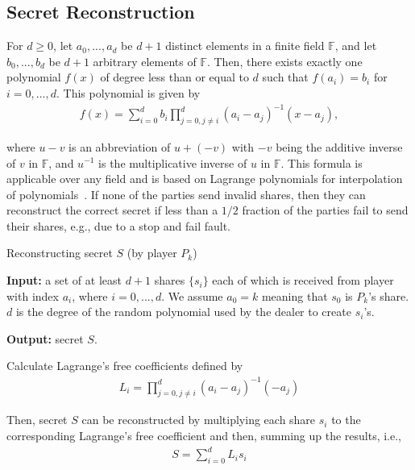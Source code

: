 \documentclass[10pt]{article}
\theoremstyle{plain}
\begin{document}
\subsection{Secret Reconstruction}

\label{sec:Shamir-Reconstruction} For $d\geq0$, let $a_{0},...,a_{d}$
be $d+1$ distinct elements in a finite field $\mathbb{F}$, and let
$b_{0},...,b_{d}$ be $d+1$ arbitrary elements of $\mathbb{F}$.
Then, there exists exactly one polynomial $f(x)$ of degree less than
or equal to $d$ such that $f(a_{i})=b_{i}$ for $i=0,...,d$. This
polynomial is given by 
\begin{align}
f(x)=\sum_{i=0}^{d}b_{i}\prod_{j=0,j\neq i}^{d}(a_{i}-a_{j})^{-1}(x-a_{j}),\label{eq:lagrange-polynomial}
\end{align}

where $u-v$ is an abbreviation of $u+(-v)$ with $-v$ being the
additive inverse of $v$ in $\mathbb{F}$, and $u^{-1}$ is the multiplicative
inverse of $u$ in $\mathbb{F}$. This formula is applicable over
any field and is based on Lagrange polynomials for interpolation of
polynomials~\cite{Huang:2010:URL}. If none of the parties send invalid
shares, then they can reconstruct the correct secret if less than
a $1/2$ fraction of the parties fail to send their shares, e.g.,
due to a stop and fail fault. 

\begin{algorithm}
	\caption{Reconstructing secret $S$ (by player $P_{k}$)}
	
	\label{pr:shamir-reconstruction} \textbf{Input:} a set of at least
	$d+1$ shares $\{s_{i}\}$ each of which is received from player with
	index $a_{i}$, where $i=0,...,d$. We assume $a_{0}=k$ meaning that
	$s_{0}$ is $P_{k}$'s share. $d$ is the degree of the random polynomial
	used by the dealer to create $s_{i}$'s.
	
	\textbf{Output:} secret $S$.
	
	Calculate Lagrange's free coefficients defined by 
	\begin{align}
	L_{i}=\prod_{j=0,j\neq i}^{d}(a_{i}-a_{j})^{-1}(-a_{j})\label{eq:lagrange-coeffs}
	\end{align}
	
	Then, secret $S$ can be reconstructed by multiplying each share $s_{i}$
	to the corresponding Lagrange's free coefficient and then, summing
	up the results, i.e., 
	\begin{align}
	S=\sum_{i=0}^{d}L_{i}s_{i}\label{eq:shamir-reconstruct}
	\end{align}
\end{algorithm}
\end{document}
